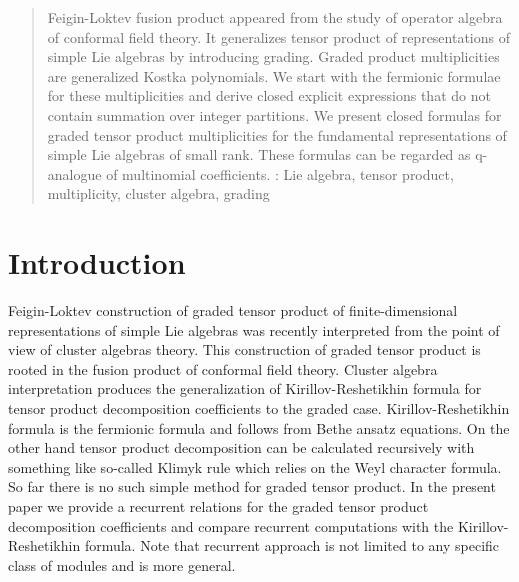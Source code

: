 \documentclass[12pt]{iopart}
\begin{document}

\author{V.D.~Lyakhovsky$^1$, A.A.~Nazarov$^{1,2}$, O.V.~Postnova$^{1}$, A..~Komisartchuk$^{1}$}
\address{ $^1$ Department of High-energy and elementary particle physics,  St Petersburg State University, 198904, Saint-Petersburg, Russia}



\begin{abstract}
  Feigin-Loktev fusion product appeared from the study of operator algebra of conformal field
  theory. It generalizes tensor product of representations of simple Lie algebras by introducing
  grading. Graded product multiplicities are generalized Kostka polynomials. We start with the
  fermionic formulae for these multiplicities and derive closed explicit expressions that do not
  contain summation over integer partitions. We present closed formulas for graded tensor product
  multiplicities for the fundamental representations of simple Lie algebras of small rank. These
  formulas can be regarded as q-analogue of multinomial coefficients. 
: Lie algebra, tensor product, multiplicity, cluster algebra, grading
\end{abstract}

\submitto{\jpa}

\section{Introduction}
\label{sec:introduction}

Feigin-Loktev construction of graded tensor product of finite-dimensional representations of simple
Lie algebras was recently interpreted from the point of view of cluster algebras theory. This
construction of graded tensor product is rooted in the fusion product of conformal field theory.
Cluster algebra interpretation produces the generalization of Kirillov-Reshetikhin formula for
tensor product decomposition coefficients to the graded case. Kirillov-Reshetikhin formula is the
fermionic formula and follows from Bethe ansatz equations. On the other hand tensor product
decomposition can be calculated recursively with something like so-called Klimyk rule which relies
on the Weyl character formula. So far there is no such simple method for graded tensor product. In
the present paper we provide a recurrent relations for the graded tensor product decomposition
coefficients and compare recurrent computations with the Kirillov-Reshetikhin formula. Note that
recurrent approach is not limited to any specific class of modules and is more general.
\end{document}
